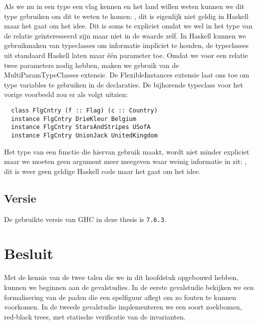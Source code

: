Als we nu in een type een vlag kennen en het land willen weten kunnen we dit
type gebruiken om dit te weten te komen: , dit is eigenlijk niet geldig in Haskell maar het gaat om
het idee. Dit is soms te expliciet omdat we wel in het type van de relatie
geïnteresseerd zijn maar niet in de waarde zelf. In Haskell kunnen we
gebruikmaken van typeclasses om informatie impliciet te houden, de typeclasses
uit standaard Haskell laten maar één parameter toe. Omdat we voor een relatie
twee parameters nodig hebben, maken we gebruik van de MultiParamTypeClasses
extensie. De FlexibleInstances extensie laat ons toe om type variables te
gebruiken in de  declaraties. De bijhorende typeclass voor het
vorige voorbeeld zou er als volgt uitzien:

\begin{verbatim}
  class FlgCntry (f :: Flag) (c :: Country)
  instance FlgCntry DrieKleur Belgium
  instance FlgCntry StarsAndStripes USofA
  instance FlgCntry UnionJack UnitedKingdom
\end{verbatim}

Het type van een functie die hiervan gebruik maakt, wordt niet minder expliciet
maar we moeten geen argument meer meegeven waar weinig informatie in zit:
, dit is weer geen geldige
Haskell code maar het gaat om het idee.

\subsection{Versie}

De gebruikte versie van GHC in deze thesis is \texttt{7.6.3}.


\section{Besluit}

Met de kennis van de twee talen die we in dit hoofdstuk opgebouwd hebben,
kunnen we beginnen aan de gevalstudies. In de eerste gevalstudie bekijken we
een formalisering van de paden die een spelfiguur aflegt om zo fouten te kunnen
voorkomen. In de tweede gevalstudie implementeren we een soort zoekbomen,
red-black trees, met statische verificatie van de invarianten.
